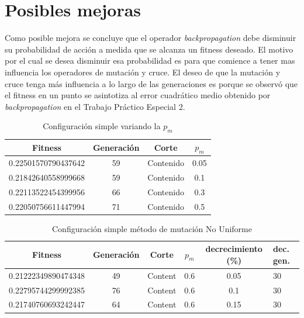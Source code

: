\documentclass{sig-alternate}
\begin{document}
\section{Posibles mejoras}

	Como posible mejora se concluye que el operador \textit{backpropagation} debe disminuir su probabilidad de acción a medida que se alcanza un fitness deseado. El motivo por el cual se desea disminuir esa probabilidad es para que comience a tener mas influencia los operadores de mutación y cruce. El deseo de que la mutación y cruce tenga más influencia a lo largo de las generaciones es porque se observó que el fitness en un punto se asintotiza al error cuadrático medio obtenido por \textit{backpropagation} en el Trabajo Práctico Especial 2.

\onecolumn

\begin{table}[htp]
	\begin{center}
	\begin{tabular}{|c|c|c|c|}
		\hline
	     Fitness & Generación & Corte & $p_{m}$ \\
		\hline
		0.22501570790437642 & 59 & Contenido & 0.05 \\
		0.21842640558999668 & 59 & Contenido & 0.1 \\
		0.22113522454399956 & 66 & Contenido & 0.3 \\ 
		0.22050756611447994 & 71 & Contenido & 0.5 \\
		\hline
	\end{tabular}
	\caption{Configuración simple variando la $p_m$}
	\label{table:simple_mutation_prob} 
	\end{center}
\end{table}

\begin{table}[htp]
	\begin{center}
	\begin{tabular}{|c|c|c|c|c|p{1cm}|}
		\hline
	     Fitness & Generación & Corte & $p_{m}$ & decrecimiento (\%) & dec. gen. \\
		\hline
		0.21222349890474348 & 49 & Content & 0.6 & 0.05 & 30 \\
		0.22795744299992385 & 76 & Content & 0.6 & 0.1  & 30 \\
		0.21740760693242447 & 64 & Content & 0.6 & 0.15 & 30 \\
		\hline
	\end{tabular}
	\caption{Configuración simple método de mutación No Uniforme}
	\label{table:simple_mutation_no_uniform} 
	\end{center}
\end{table}
\end{document}
